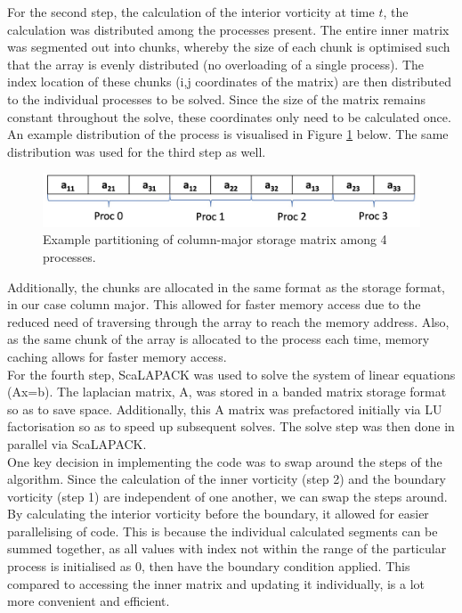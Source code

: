 \documentclass[11pt]{article}
\begin{document}
	For the second step, the calculation of the interior vorticity at time $t$, the calculation was distributed among the processes present. The entire inner matrix was segmented out into chunks, whereby the size of each chunk is optimised such that the array is evenly distributed (no overloading of a single process). The index location of these chunks (i,j coordinates of the matrix) are then distributed to the individual processes to be solved. Since the size of the matrix remains constant throughout the solve, these coordinates only need to be calculated once. An example distribution of the process is visualised in Figure \ref{fig:partitioning_example} below. The same distribution was used for the third step as well.
	
	\begin{figure}[htb]
		\centering
		\includegraphics[width=\linewidth]{partition.jpg} 
	   	\caption{Example partitioning of column-major storage matrix among 4 processes.}
	   	\label{fig:partitioning_example}
	\end{figure}
	
	Additionally, the chunks are allocated in the same format as the storage format, in our case column major. This allowed for faster memory access due to the reduced need of traversing through the array to reach the memory address. Also, as the same chunk of the array is allocated to the process each time, memory caching allows for faster memory access.\\
	
	For the fourth step, ScaLAPACK was used to solve the system of linear equations (Ax=b). The laplacian matrix, A, was stored in a banded matrix storage format so as to save space. Additionally, this A matrix was prefactored initially via LU factorisation so as to speed up subsequent solves. The solve step was then done in parallel via ScaLAPACK.\\
	
	One key decision in implementing the code was to swap around the steps of the algorithm. Since the calculation of the inner vorticity (step 2) and the boundary vorticity (step 1) are independent of one another, we can swap the steps around. By calculating the interior vorticity before the boundary, it allowed for easier parallelising of code. This is because the individual calculated segments can be summed together, as all values with index not within the range of the particular process is initialised as 0, then have the boundary condition applied. This compared to accessing the inner matrix and updating it individually, is a lot more convenient and efficient. 
		
\end{document}
